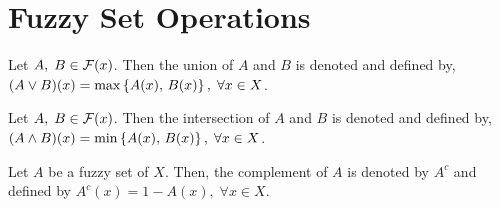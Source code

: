 \documentclass[../main-sheet.tex]{subfiles}
\begin{document}
\section{Fuzzy Set Operations}
\begin{defn}
    Let \(A,\; B\in \mathcal{F}(x)\). Then the union of \(A\) and \(B\) is denoted and defined by, \((A\vee B) (x)=\max\left\{A(x),\,B(x)\right\},\;\forall x\in X\).
\end{defn}
\begin{defn}
    Let \(A,\; B\in \mathcal{F}(x)\). Then the intersection of \(A\) and \(B\) is denoted and defined by, \((A\wedge B) (x)=\min\left\{A(x),\,B(x)\right\},\;\forall x\in X\).
\end{defn}
\begin{defn}
    Let \(A\) be a fuzzy set of \(X\). Then, the complement of \(A\) is denoted by \(A^c\) and defined by \(A^c(x)=1-A(x),\;\forall x\in X\).
\end{defn}
\end{document}
